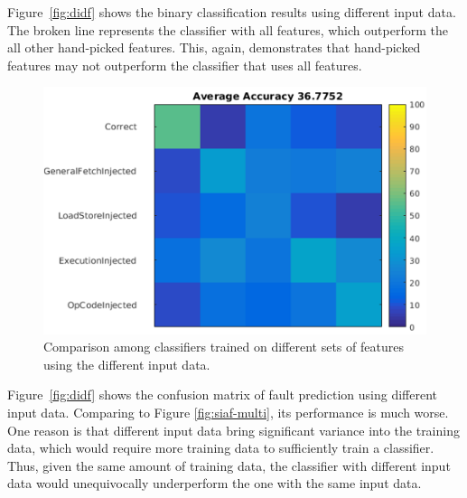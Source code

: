 Figure~\ref{fig:didf} shows the binary classification results using different input data. The broken line represents the classifier with all features, which outperform the all other hand-picked features. This, again, demonstrates that hand-picked features may not outperform the classifier that uses all features.

\begin{figure}[t]
\begin{center}
   \includegraphics[width=0.8\linewidth]{./figures/diaf_multi.png}
\end{center}
\vspace{-0.3cm}
   \caption{Comparison among classifiers trained on different sets of features using the different input data.}
\label{fig:diaf-multi}
   \vspace{-0.3cm}
\end{figure}

Figure~\ref{fig:didf} shows the confusion matrix of fault prediction using different input data. Comparing to Figure \ref{fig:siaf-multi}, its performance is much worse. One reason is that different input data bring significant variance into the training data, which would require more training data to sufficiently train a classifier. Thus, given the same amount of training data, the classifier with different input data would unequivocally underperform the one with the same input data.

